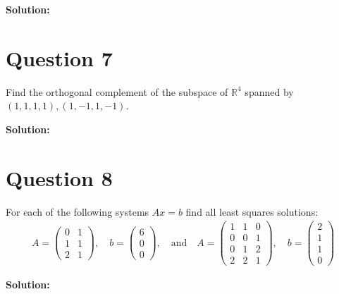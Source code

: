 \documentclass{article}
\begin{document}
\vspace{0.25cm}\noindent\textbf{Solution:}

\section*{Question 7}
Find the orthogonal complement of the subspace of \(\mathbb{R}^4\) spanned by \((1, 1, 1, 1), (1, -1, 1, -1)\).

\vspace{0.25cm}\noindent\textbf{Solution:}

\section*{Question 8}
For each of the following systems \(Ax = b\) find all least squares solutions:
\begin{align*}
    A = \begin{pmatrix} 0 & 1 \\ 1 & 1 \\ 2 & 1 \end{pmatrix}, \quad 
    b = \begin{pmatrix} 6 \\ 0 \\ 0 \end{pmatrix}, \quad \text{and} \quad
    A = \begin{pmatrix} 1 & 1 & 0 \\ 0 & 0 & 1 \\ 0 & 1 & 2 \\ 2 & 2 & 1 \end{pmatrix}, \quad 
    b = \begin{pmatrix} 2 \\ 1 \\ 1 \\ 0 \end{pmatrix}
\end{align*}

\vspace{0.25cm}\noindent\textbf{Solution:}
\end{document}
